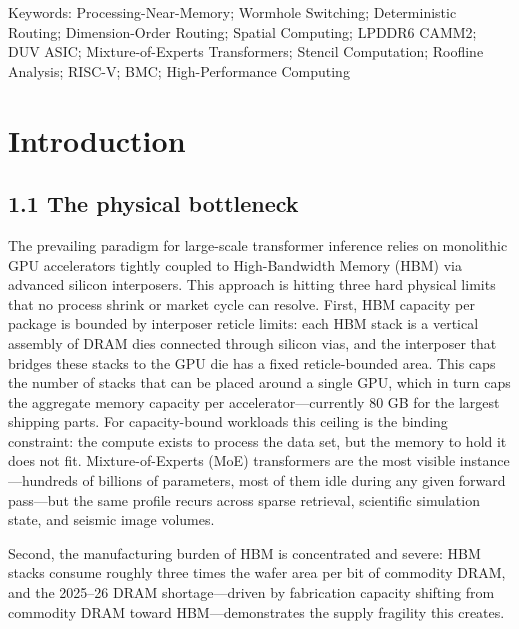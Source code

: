 \documentclass[12pt,onecolumn]{article}
\begin{document}
Keywords: Processing-Near-Memory; Wormhole Switching; Deterministic Routing; Dimension-Order Routing; Spatial Computing; LPDDR6 CAMM2; DUV ASIC; Mixture-of-Experts Transformers; Stencil Computation; Roofline Analysis; RISC-V; BMC; High-Performance Computing

\section*{Introduction}\label{sec:introduction}

\subsection*{1.1 The physical bottleneck}\label{sec:1.1}

The prevailing paradigm for large-scale transformer inference relies on monolithic GPU accelerators tightly coupled to High-Bandwidth Memory (HBM) via advanced silicon interposers\cite{2,15}. This approach is hitting three hard physical limits that no process shrink or market cycle can resolve.\cite{1} First, HBM capacity per package is bounded by interposer reticle limits: each HBM stack is a vertical assembly of DRAM dies connected through silicon vias, and the interposer that bridges these stacks to the GPU die has a fixed reticle-bounded area\cite{15}. This caps the number of stacks that can be placed around a single GPU, which in turn caps the aggregate memory capacity per accelerator---currently 80 GB for the largest shipping parts. For capacity-bound workloads this ceiling is the binding constraint: the compute exists to process the data set, but the memory to hold it does not fit. Mixture-of-Experts (MoE) transformers are the most visible instance---hundreds of billions of parameters, most of them idle during any given forward pass\cite{3,4}---but the same profile recurs across sparse retrieval, scientific simulation state, and seismic image volumes.

Second, the manufacturing burden of HBM is concentrated and severe: HBM stacks consume roughly three times the wafer area per bit of commodity DRAM, and the 2025--26 DRAM shortage---driven by fabrication capacity shifting from commodity DRAM toward HBM---demonstrates the supply fragility this creates\cite{25}.
\end{document}

